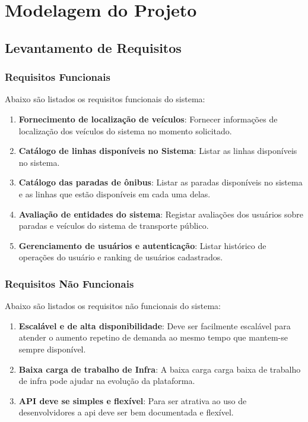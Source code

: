 \chapter{Modelagem do Projeto} \label{cha:modelagem}

\section{Levantamento de Requisitos}

\subsection{Requisitos Funcionais}
  Abaixo são listados os requisitos funcionais do sistema: 

  \begin{enumerate}
    \item \textbf{Fornecimento de localização de veículos}: Fornecer informações de localização dos veículos do sistema no momento solicitado.
    \item \textbf{Catálogo de linhas disponíveis no Sistema}: Listar as linhas disponíveis no sistema.
    \item \textbf{Catálogo das paradas de ônibus}: Listar as paradas disponíveis no sistema e as linhas que estão disponíveis em cada uma delas.
    \item \textbf{Avaliação de entidades do sistema}: Registar avaliações dos usuários sobre paradas e veículos do sistema de transporte público.
    \item \textbf{Gerenciamento de usuários e autenticação}: Listar histórico de operações do usuário e ranking de usuários cadastrados.  
  \end{enumerate}

\subsection{Requisitos Não Funcionais}
  Abaixo são listados os requisitos não funcionais do sistema:

  \begin{enumerate}
    \item \textbf{Escalável e de alta disponibilidade}: Deve ser facilmente escalável para atender o aumento repetino de demanda ao mesmo 
    tempo que mantem-se sempre disponível.
    \item \textbf{Baixa carga de trabalho de Infra}: A baixa carga carga baixa de trabalho de infra pode ajudar na evolução da plataforma. 
    \item \textbf{API deve se simples e flexível}: Para ser atrativa ao uso de desenvolvidores a api deve ser bem documentada e flexível.
  \end{enumerate}

